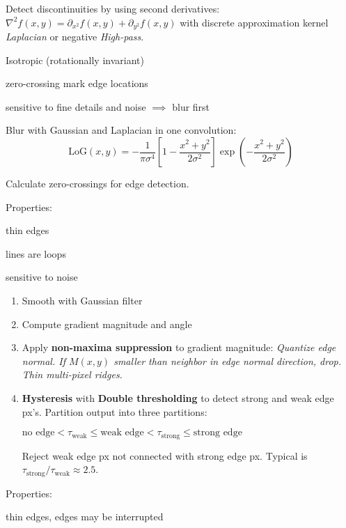 \begin{definition}
  Detect discontinuities by using second derivatives:
  \(\nabla^2f(x, y) = \partial_{x^2} f(x, y) + \partial_{y^2}f(x, y)\) with discrete approximation kernel \textit{Laplacian} or negative \textit{High-pass}.

  \begin{itemize*}
    \item Isotropic (rotationally invariant)
    \item zero-crossing mark edge locations
    \item sensitive to fine details and noise \(\implies\) blur first
  \end{itemize*}
\end{definition}

\begin{algorithm}[LoG]
  Blur with Gaussian and Laplacian in one convolution:
  \[\text{LoG}(x, y) = -\frac{1}{\pi \sigma^4} \left[1 - \frac{x^2 + y^2}{2\sigma^2}\right]\exp\left(-\frac{x^2 + y^2}{2\sigma^2}\right)\]

  Calculate zero-crossings for edge detection.

  Properties:
  \begin{itemize*}
    \item thin edges
    \item lines are loops
    \item sensitive to noise
  \end{itemize*}
\end{algorithm}

\begin{algorithm}[Canny]
  \begin{enumerate}
    \item Smooth with Gaussian filter
    \item Compute gradient magnitude and angle
    \item Apply \textbf{non-maxima suppression} to gradient magnitude:
    \textit{Quantize edge normal. If \(M(x, y)\) smaller than neighbor in edge normal direction, drop. Thin multi-pixel ridges.}
    \item \textbf{Hysteresis} with \textbf{Double thresholding} to detect strong and weak edge px's. Partition output into three partitions:
    \begin{center}
      \(\text{no edge} < \tau_{\text{weak}} \leq \text{weak edge} < \tau_{\text{strong}} \leq \text{strong edge}\)
    \end{center}
    Reject weak edge px not connected with strong edge px. Typical is \(\tau_{\text{strong}} / \tau_{\text{weak}} \approx 2.5\).
  \end{enumerate}

  Properties:
  \begin{itemize*}
    \item thin edges, edges may be interrupted
  \end{itemize*}
\end{algorithm}

